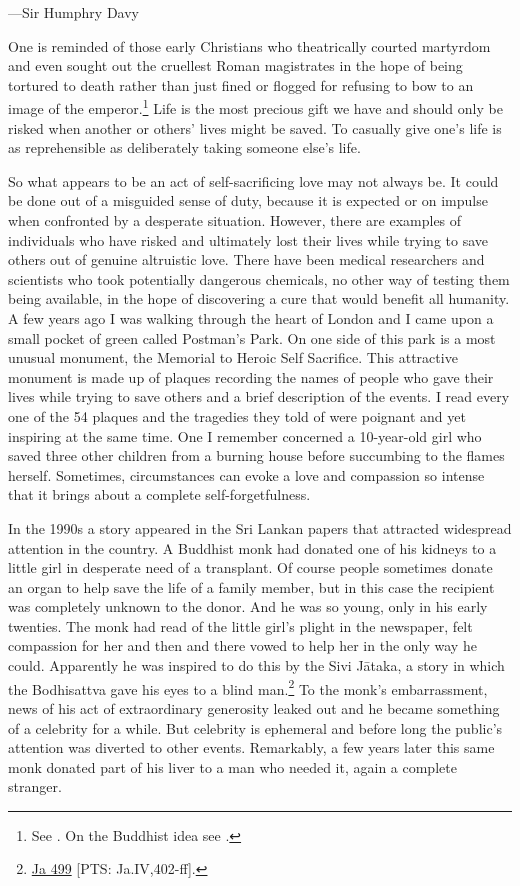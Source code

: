 \documentclass[10pt, openright]{book}
\newenvironment{epigram-2-cite}%
{%
\quoting[leftmargin=2.5cm,rightmargin=2.5cm]%
\noindent\normal\hspace*{\fill} 
}%
{\endquoting\vspace{1em}
}%
\begin{document}
\begin{epigram-2-cite}
—Sir Humphry Davy
\end{epigram-2-cite}

One is reminded of those early Christians who theatrically courted martyrdom and even sought out the cruellest Roman magistrates in the hope of being tortured to death rather than just fined or flogged for refusing to bow to an image of the emperor.\footnote {See \cite{Droge and Tabor 1992}. On the Buddhist idea see \cite{Ohnuma 2008}.} Life is the most precious gift we have and should only be risked when another or others’ lives might be saved. To casually give one’s life is as reprehensible as deliberately taking someone else’s life.


So what appears to be an act of self-sacrificing love may not always be. It could be done out of a misguided sense of duty, because it is expected or on impulse when confronted by a desperate situation. However, there are examples of individuals who have risked and ultimately lost their lives while trying to save others out of genuine altruistic love. There have been medical researchers and scientists who took potentially dangerous chemicals, no other way of testing them being available, in the hope of discovering a cure that would benefit all humanity. A few years ago I was walking through the heart of London and I came upon a small pocket of green called Postman’s Park. On one side of this park is a most unusual monument, the Memorial to Heroic Self Sacrifice. This attractive monument is made up of plaques recording the names of people who gave their lives while trying to save others and a brief description of the events. I read every one of the 54 plaques and the tragedies they told of were poignant and yet inspiring at the same time. One I remember concerned a 10-year-old girl who saved three other children from a burning house before succumbing to the flames herself. Sometimes, circumstances can evoke a love and compassion so intense that it brings about a complete self-forgetfulness.


In the 1990s a story appeared in the Sri Lankan papers that attracted widespread attention in the country. A Buddhist monk had donated one of his kidneys to a little girl in desperate need of a transplant. Of course people sometimes donate an organ to help save the life of a family member, but in this case the recipient was completely unknown to the donor. And he was so young, only in his early twenties. The monk had read of the little girl’s plight in the newspaper, felt compassion for her and then and there vowed to help her in the only way he could. Apparently he was inspired to do this by the Sivi Jātaka, a story in which the Bodhisattva gave his eyes to a blind man.\footnote {\href{https://suttacentral.net/ja499/en/rouse}{Ja 499} [PTS: Ja.IV,402-ff].} To the monk’s embarrassment, news of his act of extraordinary generosity leaked out and he became something of a celebrity for a while. But celebrity is ephemeral and before long the public’s attention was diverted to other events. Remarkably, a few years later this same monk donated part of his liver to a man who needed it, again a complete stranger.
\end{document}
